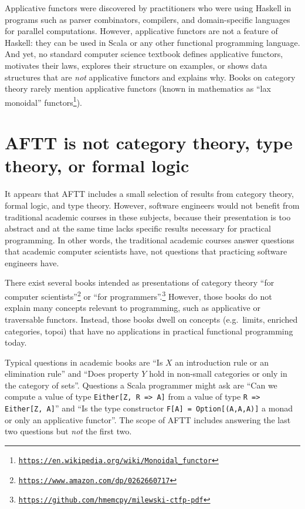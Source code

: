 Applicative functors were discovered by practitioners who were using
Haskell in programs such as parser combinators, compilers, and domain-specific
languages for parallel computations. However, applicative functors
are not a feature of Haskell: they can be used in Scala or any other
functional programming language. And yet, no standard computer science
textbook defines applicative functors, motivates their laws, explores
their structure on examples, or shows data structures that are \emph{not}
applicative functors and explains why. Books on category theory rarely
mention applicative functors (known in mathematics as ``lax monoidal''
functors\footnote{\texttt{\href{https://en.wikipedia.org/wiki/Monoidal_functor}{https://en.wikipedia.org/wiki/Monoidal\_functor}}}).

\section{AFTT is not category theory, type theory, or formal logic}

It appears that AFTT includes a small selection of results from category
theory, formal logic, and type theory. However, software engineers
would not benefit from traditional academic courses in these subjects,
because their presentation is too abstract and at the same time lacks
specific results necessary for practical programming. In other words,
the traditional academic courses answer questions that academic computer
scientists have, not questions that practicing software engineers
have.

There exist several books intended as presentations of category theory
``for computer scientists''\footnote{\texttt{\href{https://www.amazon.com/dp/0262660717}{https://www.amazon.com/dp/0262660717}}}
or ``for programmers''.\footnote{\texttt{\href{https://github.com/hmemcpy/milewski-ctfp-pdf}{https://github.com/hmemcpy/milewski-ctfp-pdf}}}
However, those books do not explain many concepts relevant to programming,
such as applicative or traversable functors. Instead, those books
dwell on concepts (e.g.~limits, enriched categories, topoi) that
have no applications in practical functional programming today.

Typical questions in academic books are ``Is $X$ an introduction
rule or an elimination rule'' and ``Does property $Y$ hold in non-small
categories or only in the category of sets''. Questions a Scala programmer
might ask are ``Can we compute a value of type \lstinline!Either[Z, R => A]!
from a value of type \lstinline!R => Either[Z, A]!'' and ``Is the
type constructor \lstinline!F[A] = Option[(A,A,A)]! a monad or only
an applicative functor''. The scope of AFTT includes answering the
last two questions but \emph{not} the first two.

